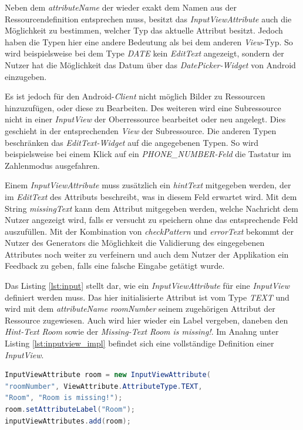 Neben dem \textit{attributeName} der wieder exakt dem Namen aus der Ressourcendefinition entsprechen muss, besitzt das \textit{InputViewAttribute} auch die Möglichkeit zu bestimmen, welcher Typ das aktuelle Attribut besitzt. Jedoch haben die Typen hier eine andere Bedeutung als bei dem anderen \textit{View}-Typ. So wird beispielsweise bei dem Type \textit{DATE} kein \textit{EditText} angezeigt, sondern der Nutzer hat die Möglichkeit das Datum über das \textit{DatePicker-Widget} von Android einzugeben. 

Es ist jedoch für den Android-\textit{Client} nicht möglich Bilder zu Ressourcen hinzuzufügen, oder diese zu Bearbeiten. Des weiteren wird eine Subressource nicht in einer \textit{InputView} der Oberressource bearbeitet oder neu angelegt. Dies geschieht in der entsprechenden \textit{View} der Subressource. Die anderen Typen beschränken das \textit{EditText-Widget} auf die angegebenen Typen. So wird beispielsweise bei einem Klick auf ein \textit{PHONE\_NUMBER-Feld} die Tastatur im Zahlenmodus ausgefahren.

Einem \textit{InputViewAttribute} muss zusätzlich ein \textit{hintText} mitgegeben werden, der im \textit{EditText} des Attributs beschreibt, was in diesem Feld erwartet wird. Mit dem String \textit{missingText} kann dem Attribut mitgegeben werden, welche Nachricht dem Nutzer angezeigt wird, falls er versucht zu speichern ohne das entsprechende Feld auszufüllen. Mit der Kombination von \textit{checkPattern} und \textit{errorText} bekommt der Nutzer des Generators die Möglichkeit die Validierung des eingegebenen Attributes noch weiter zu verfeinern und auch dem Nutzer der Applikation ein Feedback zu geben, falls eine falsche Eingabe getätigt wurde.

Das Listing \ref{lst:input} stellt dar, wie ein \textit{InputViewAttribute} für eine \textit{InputView} definiert werden muss. Das hier initialisierte Attribut ist vom Type \textit{TEXT} und wird mit dem \textit{attributeName} \textit{roomNumber} seinem zugehörigen Attribut der Ressource zugewiesen.
Auch wird hier wieder ein Label vergeben, daneben den \textit{Hint-Text} \textit{Room} sowie der \textit{Missing-Text} \textit{Room is missing!}.
Im Anahng unter Listing \ref{lst:inputview_impl} befindet sich eine vollständige Definition einer \textit{InputView}.

\begin{lstlisting}[label=lst:input,
language=java,
firstnumber=1,
caption=Definition von \textit{InputViewAttributes} einer \textit{InputView}.]	
InputViewAttribute room = new InputViewAttribute(
"roomNumber", ViewAttribute.AttributeType.TEXT, 
"Room", "Room is missing!");
room.setAttributeLabel("Room");
inputViewAttributes.add(room);
\end{lstlisting}

